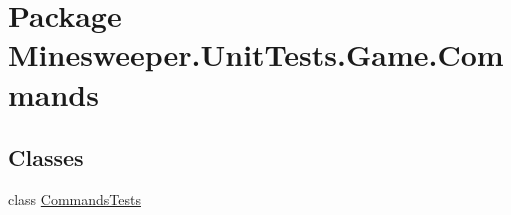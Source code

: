 \hypertarget{namespace_minesweeper_1_1_unit_tests_1_1_game_1_1_commands}{\section{Package Minesweeper.\+Unit\+Tests.\+Game.\+Commands}
\label{namespace_minesweeper_1_1_unit_tests_1_1_game_1_1_commands}
}
\subsection*{Classes}
\begin{DoxyCompactItemize}
\item 
class \hyperlink{class_minesweeper_1_1_unit_tests_1_1_game_1_1_commands_1_1_commands_tests}{Commands\+Tests}
\end{DoxyCompactItemize}
